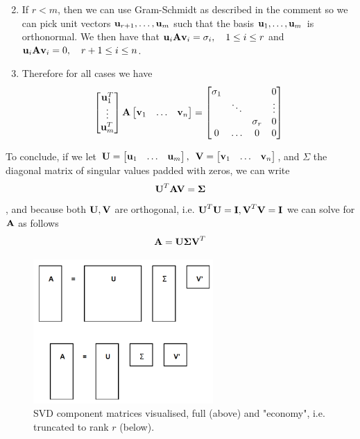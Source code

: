 \documentclass[a4paper]{article}
\numberwithin{equation}{section} %
\newcommand{\hquad}{\hskip0.5em\relax}%
\newcommand{\B}[1]{\textbf{\textup{#1}}} %
\begin{document}
\begin{enumerate}
\[\]
\item If $r<m$, then we can use Gram-Schmidt as described in the comment so we can pick unit vectors $\B{u}_{r+1},\ldots,\B{u}_m$ such that the basis $\B{u}_1,\ldots,\B{u}_m$ is orthonormal. We then have that $\B{u}_i\B{A}\B{v}_i=\sigma_i, \quad 1\leq i \leq r$ and $\B{u}_i\B{A}\B{v}_i=0, \quad r+1\leq i \leq n$.
\item Therefore for all cases we have
\[
\begin{bmatrix} \B{u}_1^T \\ \vdots \\ \B{u}_m^T \end{bmatrix}
\B{A}
\begin{bmatrix} \B{v}_1 & \ldots & \B{v}_n \end{bmatrix} = 
\begin{bmatrix} \sigma_1 & & &0\\ & \ddots & & \vdots\\ & & \sigma_r & 0\\ 0 & \ldots &0 & 0\end{bmatrix}
\]
\end{enumerate}
To conclude, if we let $\B{U}=\begin{bmatrix} \B{u}_1 & \ldots & \B{u}_m \end{bmatrix}, \hquad \B{V}=\begin{bmatrix} \B{v}_1 & \ldots & \B{v}_n \end{bmatrix}$, and $\Sigma$ the diagonal matrix of singular values padded with zeros, we can write
\[
\B{U}^T\B{AV}=\boldsymbol{\Sigma}
\]
, and because both $\B{U},\B{V}$ are orthogonal, i.e. $\B{U}^T\B{U}=\B{I},\B{V}^T\B{V}=\B{I}$ we can solve for $\B{A}$ as follows
\begin{equation}
\B{A}=\B{U}\boldsymbol{\Sigma}\B{V}^T
\label{eq:svd}
\end{equation}
\begin{figure}[H]
	\centering %
	\includegraphics[height=5.5cm]{full_and_trunc_svd.PNG}
    \caption{SVD component matrices visualised, full (above) and "economy", i.e. truncated to rank $r$ (below).}
    \label{fig:svd_vis_01}
\end{figure}
\end{document}
